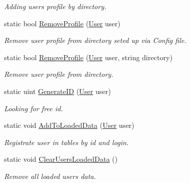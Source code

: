 \begin{DoxyCompactItemize}
\begin{DoxyCompactList}\small\item\em Adding user\textquotesingle{}s profile by directory. \end{DoxyCompactList}\item 
static bool \mbox{\hyperlink{class_authority_controller_1_1_a_p_i_1_1_users_a7239ac583f20a03adc376681494b82bb}{Remove\+Profile}} (\mbox{\hyperlink{class_authority_controller_1_1_data_1_1_personal_1_1_user}{User}} user)
\begin{DoxyCompactList}\small\item\em Remove user profile from directory seted up via Config file. \end{DoxyCompactList}\item 
static bool \mbox{\hyperlink{class_authority_controller_1_1_a_p_i_1_1_users_aa57a37410c6bc6a47ee79c0d3438b028}{Remove\+Profile}} (\mbox{\hyperlink{class_authority_controller_1_1_data_1_1_personal_1_1_user}{User}} user, string directory)
\begin{DoxyCompactList}\small\item\em Remove user profile from directory. \end{DoxyCompactList}\item 
static uint \mbox{\hyperlink{class_authority_controller_1_1_a_p_i_1_1_users_ae0fd30410e8632a3ee5d8dc24e722fac}{Generate\+ID}} (\mbox{\hyperlink{class_authority_controller_1_1_data_1_1_personal_1_1_user}{User}} user)
\begin{DoxyCompactList}\small\item\em Looking for free id. \end{DoxyCompactList}\item 
static void \mbox{\hyperlink{class_authority_controller_1_1_a_p_i_1_1_users_a9cdaba595a8b1d2e49690bebeca969d2}{Add\+To\+Loaded\+Data}} (\mbox{\hyperlink{class_authority_controller_1_1_data_1_1_personal_1_1_user}{User}} user)
\begin{DoxyCompactList}\small\item\em Registrate user in tables by id and login. \end{DoxyCompactList}\item 
static void \mbox{\hyperlink{class_authority_controller_1_1_a_p_i_1_1_users_a4c078940968eaa39c6d9eff30f1f90dc}{Clear\+Users\+Loaded\+Data}} ()
\begin{DoxyCompactList}\small\item\em Remove all loaded users data. \end{DoxyCompactList}\item 

\end{DoxyCompactItemize}

